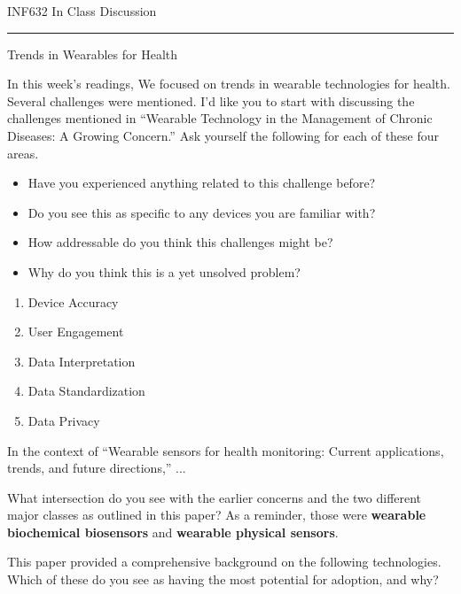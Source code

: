 \documentclass[11pt]{article}
\begin{document}
\Huge INF632 In Class Discussion
\normalsize ~

\noindent\rule{\textwidth}{1pt}\vspace{.5em}

\LARGE Trends in Wearables for Health
\normalsize ~

In this week's readings, We focused on trends in wearable technologies for health.  Several challenges were mentioned.  I'd like you to start with discussing the challenges mentioned in ``Wearable Technology in the Management of Chronic Diseases: A Growing Concern.''  Ask yourself the following for each of these four areas.
\begin{itemize}
		\item Have you experienced anything related to this challenge before?
		\item Do you see this as specific to any devices you are familiar with?
		\item How addressable do you think this challenges might be?
		\item Why do you think this is a yet unsolved problem?
	\end{itemize}

\begin{enumerate}
\item Device Accuracy
\vspace{0.5in}
\item User Engagement
\vspace{0.5in}
\item Data Interpretation
\vspace{0.5in}
\item Data Standardization
\vspace{0.5in}
\item Data Privacy
\vspace{0.5in}

\end{enumerate}

In the context of ``Wearable sensors for health monitoring: Current applications, trends, and future directions,'' ...

What intersection do you see with the earlier concerns and the two different major classes as outlined in this paper?  As a reminder, those were {\bf wearable biochemical biosensors} and {\bf wearable physical sensors}.

\vspace{0.5in}

\newpage
This paper provided a comprehensive background on the following technologies.  Which of these do you see as having the most potential for adoption, and why?
\end{document}
